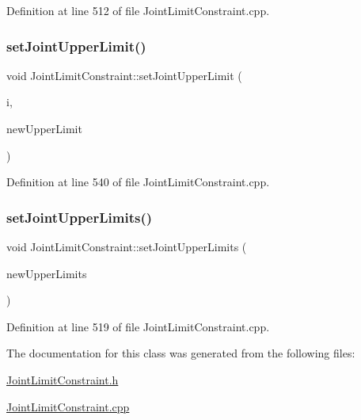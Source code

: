 Definition at line 512 of file Joint\+Limit\+Constraint.\+cpp.

\hypertarget{classocra_1_1JointLimitConstraint_a4dd11a29e4ba9655efa588292335559d}{}\label{classocra_1_1JointLimitConstraint_a4dd11a29e4ba9655efa588292335559d} 
\subsubsection{\texorpdfstring{set\+Joint\+Upper\+Limit()}{setJointUpperLimit()}}
{\footnotesize\ttfamily void Joint\+Limit\+Constraint\+::set\+Joint\+Upper\+Limit (\begin{DoxyParamCaption}\item[{int}]{i,  }\item[{double}]{new\+Upper\+Limit }\end{DoxyParamCaption})}



Definition at line 540 of file Joint\+Limit\+Constraint.\+cpp.

\hypertarget{classocra_1_1JointLimitConstraint_ad019e751fdb343ea0bd29efab8f4d5d2}{}\label{classocra_1_1JointLimitConstraint_ad019e751fdb343ea0bd29efab8f4d5d2} 
\subsubsection{\texorpdfstring{set\+Joint\+Upper\+Limits()}{setJointUpperLimits()}}
{\footnotesize\ttfamily void Joint\+Limit\+Constraint\+::set\+Joint\+Upper\+Limits (\begin{DoxyParamCaption}\item[{const Eigen\+::\+Vector\+Xd \&}]{new\+Upper\+Limits }\end{DoxyParamCaption})}



Definition at line 519 of file Joint\+Limit\+Constraint.\+cpp.



The documentation for this class was generated from the following files\+:\begin{DoxyCompactItemize}
\item 
\hyperlink{JointLimitConstraint_8h}{Joint\+Limit\+Constraint.\+h}\item 
\hyperlink{JointLimitConstraint_8cpp}{Joint\+Limit\+Constraint.\+cpp}\end{DoxyCompactItemize}
